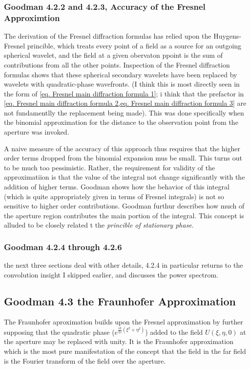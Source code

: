 \documentclass[../../main.tex]{subfiles}
\begin{document}
\subsubsection{Goodman 4.2.2 and 4.2.3, Accuracy of the Fresnel Approximtion}
The derivation of the Fresnel diffraction formulas has relied upon the Huygens-Fresnel princible, which treats every point of a field as a source for an outgoing spherical wavelet, and the field at a given obervaton ppoint is the sum of contributions from all the other points. Inspection of the Fresnel diffraction formulas shows that these spherical secondary wavelets have been replaced by wavelets with quadratic-phase wavefronts. (I think this is most directly seen in the form of \cref{eq. Fresnel main diffraction formula 1}; i think that the prefactor in \cref{eq. Fresnel main diffraction formula 2,eq. Fresnel main diffraction formula 3} are not fundamentlly the replacement being made). This was done specifically when the binomial approximation for the distance to the observation point from the aperture was invoked. 

A naive measure of the accuracy of this approach thus requires that the higher order terms dropped from the binomial expansion mus be small. This turns out to be much too pessimistic. Rather, the requirement for validity of the approximatiion is that the value of the integral not change significantly with the addition of higher terms. Goodman shows how the behavior of this integral (which is quite appropriately given in terms of Fresnel integrals) is not so sensitive to higher order contributions. Goodman furthur describes how much of the aperture region contributes the main portion of the integral. This concept is alluded to be closely related t the \textit{princible of stationary phase}. 

\subsubsection{Goodman 4.2.4 through 4.2.6}
the next three sections deal with other details, 4.2.4 in particular returns to the convolution insight I skipped earlier, and discusses the power spectrom.

\subsection{Goodman 4.3 the Fraunhofer Approximation}
The Fraunhofer aproximation builds upon the Fresnel approximation by further supposing that the quadratic phase ($e^{ \frac{ik}{2z}(\xi^2+\eta^2)}$) added to the field $U(\xi,\eta,0)$ at the aperture may be replaced with unity. It is the Fraunhofer approximation which is the most pure manifestation of the concept that the field in the far field is the Fourier transform of the field over the aperture. 
\end{document}
